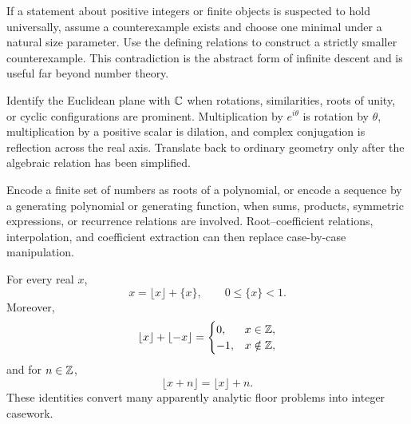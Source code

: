     \begin{strategy}
        If a statement about positive integers or finite objects is suspected to
        hold universally, assume a counterexample exists and choose one minimal
        under a natural size parameter. Use the defining relations to construct
        a strictly smaller counterexample. This contradiction is the abstract
        form of infinite descent and is useful far beyond number theory.
    \end{strategy}

    \begin{strategy}
        Identify the Euclidean plane with $\mathbb{C}$ when rotations, similarities,
        roots of unity, or cyclic configurations are prominent. Multiplication
        by $e^{i\theta}$ is rotation by $\theta$, multiplication by a positive
        scalar is dilation, and complex conjugation is reflection across the
        real axis. Translate back to ordinary geometry only after the algebraic
        relation has been simplified.
    \end{strategy}

    \begin{strategy}
        Encode a finite set of numbers as roots of a polynomial, or encode a
        sequence by a generating polynomial or generating function, when sums,
        products, symmetric expressions, or recurrence relations are involved.
        Root--coefficient relations, interpolation, and coefficient extraction
        can then replace case-by-case manipulation.
    \end{strategy}

    \begin{tactic}
        For every real $x$,
        \[
            x=\lfloor x\rfloor+\{x\},
            \qquad
            0\leq\{x\}<1.
        \]
        Moreover,
        \[
            \lfloor x\rfloor+\lfloor-x\rfloor
            =
            \begin{cases}
                0, & x\in\mathbb{Z},\\
                -1, & x\notin\mathbb{Z},
            \end{cases}
        \]
        and for $n\in\mathbb{Z}$,
        \[
            \lfloor x+n\rfloor=\lfloor x\rfloor+n.
        \]
        These identities convert many apparently analytic floor problems into
        integer casework.
    \end{tactic}

